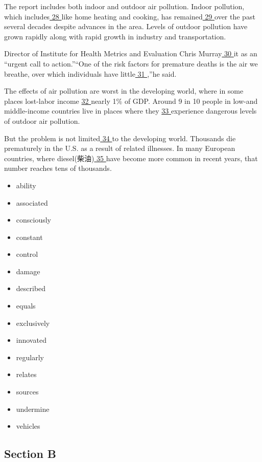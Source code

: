 \documentclass[UTF8,11pt]{ctexart}
\begin{document}
The report includes both indoor and outdoor air pollution. Indoor pollution, which includes\uline{ 28 }like home heating and cooking, has remained\uline{ 29 }over the past several decades despite advances in the area. Levels of outdoor pollution have grown rapidly along with rapid growth in industry and transportation.


Director of Institute for Health Metrics and Evaluation Chris Murray\uline{ 30 }it as an “urgent call to action.”“One of the risk factors for premature deaths is the air we breathe, over which individuals have little\uline{ 31 },”he said.


The effects of air pollution are worst in the developing world, where in some places lost-labor income \uline{32 }nearly 1\% of GDP. Around 9 in 10 people in low-and middle-income countries live in places where they \uline{33 }experience dangerous levels of outdoor air pollution.


But the problem is not limited\uline{ 34 }to the developing world. Thousands die prematurely in the U.S. as a result of related illnesses. In many European countries, where diesel(柴油)\uline{ 35 }have become more common in recent years, that number reaches tens of thousands.


\begin{itemize}[leftmargin=2em,itemsep=.2em,topsep=.4em]\item[A.] ability
\item[B.] associated
\item[C.] consciously
\item[D.] constant
\item[E.] control
\item[F.] damage
\item[G.] described
\item[H.] equals
\item[I.] exclusively
\item[J.] innovated
\item[K.] regularly
\item[L.] relates
\item[M.] sources
\item[N.] undermine
\item[O.] vehicles
\end{itemize}

\subsection*{\textbf{Section B}}
\end{document}
